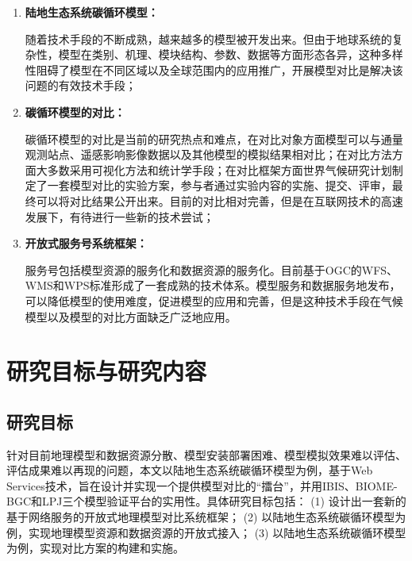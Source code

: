 \begin{enumerate}[(1)]
\item \textbf{陆地生态系统碳循环模型：}

随着技术手段的不断成熟，越来越多的模型被开发出来。但由于地球系统的复杂性，模型在类别、机理、模块结构、参数、数据等方面形态各异，这种多样性阻碍了模型在不同区域以及全球范围内的应用推广，开展模型对比是解决该问题的有效技术手段；

\item \textbf{碳循环模型的对比：}

碳循环模型的对比是当前的研究热点和难点，在对比对象方面模型可以与通量观测站点、遥感影响影像数据以及其他模型的模拟结果相对比；在对比方法方面大多数采用可视化方法和统计学手段；在对比框架方面世界气候研究计划制定了一套模型对比的实验方案，参与者通过实验内容的实施、提交、评审，最终可以将对比结果公开出来。目前的对比相对完善，但是在互联网技术的高速发展下，有待进行一些新的技术尝试；

\item \textbf{开放式服务号系统框架：}

服务号包括模型资源的服务化和数据资源的服务化。目前基于OGC的WFS、WMS和WPS标准形成了一套成熟的技术体系。模型服务和数据服务地发布，可以降低模型的使用难度，促进模型的应用和完善，但是这种技术手段在气候模型以及模型的对比方面缺乏广泛地应用。
\end{enumerate}

\section{研究目标与研究内容}

\subsection{研究目标}
针对目前地理模型和数据资源分散、模型安装部署困难、模型模拟效果难以评估、评估成果难以再现的问题，本文以陆地生态系统碳循环模型为例，基于Web Services技术，旨在设计并实现一个提供模型对比的“擂台”，并用IBIS、BIOME-BGC和LPJ三个模型验证平台的实用性。具体研究目标包括：
(1)	设计出一套新的基于网络服务的开放式地理模型对比系统框架；
(2)	以陆地生态系统碳循环模型为例，实现地理模型资源和数据资源的开放式接入； 
(3)	以陆地生态系统碳循环模型为例，实现对比方案的构建和实施。


